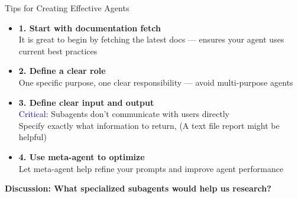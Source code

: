 \documentclass[aspectratio=169]{beamer}
\begin{document}
\begin{frame}{Tips for Creating Effective Agents}

\begin{itemize}

\item \textbf{1. Start with documentation fetch}\\
\small It is great to begin by fetching the latest docs — ensures your agent uses current best practices

\item \textbf{2. Define a clear role}\\
\small One specific purpose, one clear responsibility — avoid multi-purpose agents

\item \textbf{3. Define clear input and output}\\
\small \textcolor{blue}{Critical:} Subagents don't communicate with users directly\\
\small Specify exactly what information to return, (A text file report might be helpful)

\item \textbf{4. Use meta-agent to optimize}\\
\small Let meta-agent help refine your prompts and improve agent performance

\end{itemize}
\centering
\vspace{0.6cm}
\Large
\textbf{Discussion: What specialized subagents would help us research?}

\end{frame}
\end{document}
